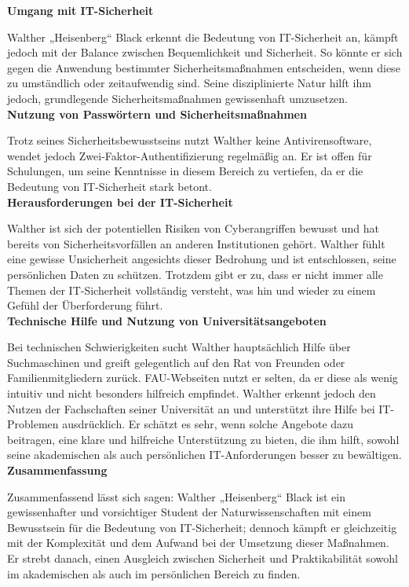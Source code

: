 \documentclass[german,report]{i1thesis}
\begin{document}
\textbf{Umgang mit IT-Sicherheit}

Walther „Heisenberg“ Black erkennt die Bedeutung von IT-Sicherheit an, kämpft jedoch mit der Balance zwischen Bequemlichkeit und Sicherheit. So könnte er sich gegen die Anwendung bestimmter Sicherheitsmaßnahmen entscheiden, wenn diese zu umständlich oder zeitaufwendig sind. Seine disziplinierte Natur hilft ihm jedoch, grundlegende Sicherheitsmaßnahmen gewissenhaft umzusetzen.\\

\textbf{Nutzung von Passwörtern und Sicherheitsmaßnahmen}

Trotz seines Sicherheitsbewusstseins nutzt Walther keine Antivirensoftware, wendet jedoch Zwei-Faktor-Authentifizierung regelmäßig an. Er ist offen für Schulungen, um seine Kenntnisse in diesem Bereich zu vertiefen, da er die Bedeutung von IT-Sicherheit stark betont.\\

\textbf{Herausforderungen bei der IT-Sicherheit}

Walther ist sich der potentiellen Risiken von Cyberangriffen bewusst und hat bereits von Sicherheitsvorfällen an anderen Institutionen gehört. Walther fühlt eine gewisse Unsicherheit angesichts dieser Bedrohung und ist entschlossen, seine persönlichen Daten zu schützen. Trotzdem gibt er zu, dass er nicht immer alle Themen der IT-Sicherheit vollständig versteht, was hin und wieder zu einem Gefühl der Überforderung führt.\\

\textbf{Technische Hilfe und Nutzung von Universitätsangeboten}

Bei technischen Schwierigkeiten sucht Walther hauptsächlich Hilfe über Suchmaschinen und greift gelegentlich auf den Rat von Freunden oder Familienmitgliedern zurück. FAU-Webseiten nutzt er selten, da er diese als wenig intuitiv und nicht besonders hilfreich empfindet. Walther erkennt jedoch den Nutzen der Fachschaften seiner Universität an und unterstützt ihre Hilfe bei IT-Problemen ausdrücklich. Er schätzt es sehr, wenn solche Angebote dazu beitragen, eine klare und hilfreiche Unterstützung zu bieten, die ihm hilft, sowohl seine akademischen als auch persönlichen IT-Anforderungen besser zu bewältigen.\\

\textbf{Zusammenfassung}

Zusammenfassend lässt sich sagen: Walther „Heisenberg“ Black ist ein gewissenhafter und vorsichtiger Student der Naturwissenschaften mit einem Bewusstsein für die Bedeutung von IT-Sicherheit; dennoch kämpft er gleichzeitig mit der Komplexität und dem Aufwand bei der Umsetzung dieser Maßnahmen. Er strebt danach, einen Ausgleich zwischen Sicherheit und Praktikabilität sowohl im akademischen als auch im persönlichen Bereich zu finden.
\end{document}
